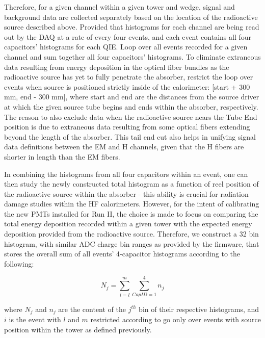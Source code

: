 Therefore, for a given channel within a given tower and wedge, signal and background data are collected separately based on the location of the
radioactive source described above. Provided that histograms for each channel
are being read out by the DAQ at a rate of every four events, and each event
contains all four capacitors' histograms for each QIE. Loop over all
events recorded for a given channel and sum together all four capacitors'
histograms. To eliminate extraneous data resulting from energy deposition
in the optical fiber bundles as the radioactive source has yet to fully
penetrate the absorber, restrict the loop over events when source is positioned strictly inside of the calorimeter: [start + 300 mm, end - 300 mm],
where start and end are the distances from the source driver at
which the given source tube begins and ends within the absorber, respectively.
The reason to also exclude data when the radioactive source nears the Tube End
position is due to extraneous data resulting from some optical fibers extending
beyond the length of the absorber. This tail end cut also helps in unifying
signal data definitions between the EM and H channels, given that the H fibers
are shorter in length than the EM fibers.

In combining the histograms from all four capacitors within an event, one can
then study the newly constructed total histogram as a function of reel position
of the radioactive source within the absorber - this ability is crucial for
radiation damage studies within the HF calorimeters. However, for the intent of
calibrating the new PMTs installed for Run II, the choice is made to focus on comparing the total energy deposition recorded within a given tower with the expected energy deposition provided from the radioactive source. Therefore, we construct a 32 bin histogram, with similar ADC charge bin ranges as provided by the firmware, that stores the overall sum of all events' 4-capacitor histograms according to the following:
\begin{center}
   \begin{equation}
      \label{eq:Histo_Sum}
      N_j = \sum\limits_{i=l}^m \sum\limits_{CapID=1}^4 n_j
   \end{equation}
\end{center}

where $N_j$ and $n_j$ are the content of the $j^{th}$ bin of their respective
histograms, and $i$ is the event with $l$ and $m$ restricted according to
go only over events with source position within the tower as defined previously.

